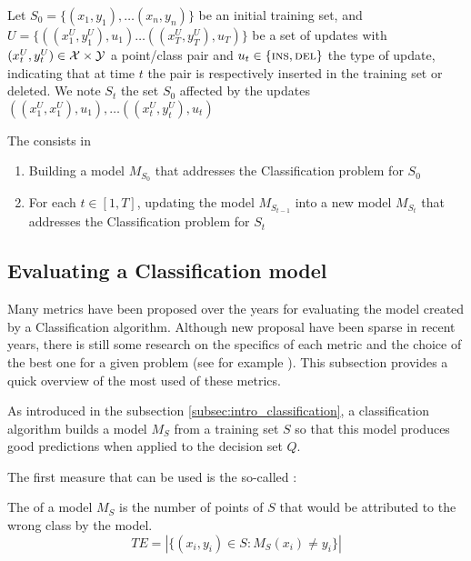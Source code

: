 \begin{definition}
Let $S_0 = \{(x_1, y_1), \dots (x_n, y_n)\}$ be an initial training set, and $U = \{((x^U_1, y^U_1), u_1) \dots ((x^U_T, y^U_T), u_T)\}$ be a set of updates with $(x^U_t, y^U_t) \in \mathcal{X} \times \mathcal{Y}$ a point/class pair and $u_t \in \{\textsc{ins}, \textsc{del}\}$ the type of update, indicating that at time $t$ the pair is respectively inserted in the training set or deleted. We note $S_t$ the set $S_0$ affected by the updates $((x^U_1, x^U_1), u_1), \dots ((x^U_t, y^U_t), u_t)$

The  consists in
\begin{enumerate}
    \item Building a model $M_{S_0}$ that addresses the Classification problem for $S_0$
    \item For each $t \in [1, T]$, updating the model $M_{S_{t-1}}$ into a new model $M_{S_t}$ that addresses the Classification problem for $S_t$
\end{enumerate}
\end{definition}

\subsection{Evaluating a Classification model}\label{subsec:intro_class_metrics}
Many metrics have been proposed over the years for evaluating the model created by a Classification algorithm. Although new proposal have been sparse in recent years, there is still some research on the specifics of each metric and the choice of the best one for a given problem (see for example \cite{Canbek2017_Class_metrics_terminology}). This subsection provides a quick overview of the most used of these metrics.

As introduced in the subsection \ref{subsec:intro_classification}, a classification algorithm builds a model $M_S$ from a training set $S$ so that this model produces good predictions when applied to the decision set $Q$.

The first measure that can be used is the so-called :
\begin{definition}
    The  of a model $M_S$ is the number of points of $S$ that would be attributed to the wrong class by the model.
    \begin{equation}
        TE = |\{(x_i, y_i)\in S: M_S(x_i) \neq y_i\}|
    \end{equation}
\end{definition}

